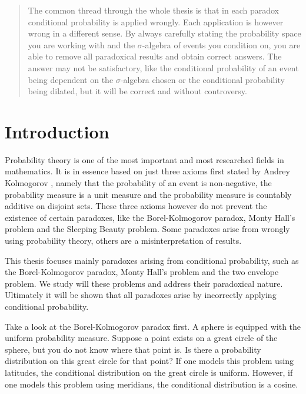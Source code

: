 \documentclass[a4paper]{report}
\theoremstyle{plain}
\theoremstyle{definition}
\theoremstyle{remark}
\numberwithin{equation}{chapter}
\DeclareMathOperator{\1}{\mathbbm{1}}
\begin{document}
\begin{abstract}
The common thread through the whole thesis is that in each paradox conditional probability is applied wrongly. Each application is however wrong in a different sense. By always carefully stating the probability space you are working with and the $\sigma$-algebra of events you condition on, you are able to remove all paradoxical results and obtain correct answers. The answer may not be satisfactory, like the conditional probability of an event being dependent on the $\sigma$-algebra chosen or the conditional probability being dilated, but it will be correct and without controversy.
\end{abstract}


\setcounter{page}{2}
\tableofcontents

\chapter{Introduction}
Probability theory is one of the most important and most researched fields in mathematics. It is in essence based on just three axioms first stated by Andrey Kolmogorov \cite{Kolmogorov33}, namely that the probability of an event is non-negative, the probability measure is a unit measure and the probability measure is countably additive on disjoint sets. These three axioms however do not prevent the existence of certain paradoxes, like the Borel-Kolmogorov paradox, Monty Hall's problem and the Sleeping Beauty problem. Some paradoxes arise from wrongly using probability theory, others are a misinterpretation of results.

This thesis focuses mainly paradoxes arising from conditional probability, such as the Borel-Kolmogorov paradox, Monty Hall's problem and the two envelope problem. We study will these problems and address their paradoxical nature. Ultimately it will be shown that all paradoxes arise by incorrectly applying conditional probability.

Take a look at the Borel-Kolmogorov paradox first. A sphere is equipped with the uniform probability measure. Suppose a point exists on a great circle of the sphere, but you do not know where that point is. Is there a probability distribution on this great circle for that point? If one models this problem using latitudes, the conditional distribution on the great circle is uniform. However, if one models this problem using meridians, the conditional distribution is a cosine.
\end{document}
